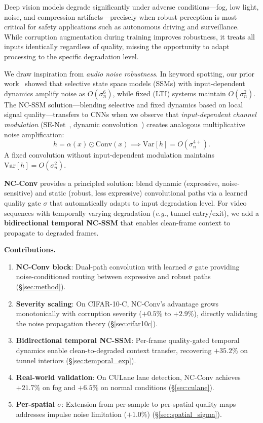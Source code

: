 \documentclass[runningheads]{llncs}
\newcommand{\eg}{\emph{e.g.}}
\begin{document}
Deep vision models degrade significantly under adverse conditions---fog, low light, noise, and compression artifacts---precisely when robust perception is most critical for safety applications such as autonomous driving and surveillance.
While corruption augmentation during training improves robustness, it treats all inputs identically regardless of quality, missing the opportunity to adapt processing to the specific degradation level.

We draw inspiration from \emph{audio noise robustness}.
In keyword spotting, our prior work~\cite{choi2026ncssm} showed that selective state space models (SSMs) with input-dependent dynamics amplify noise as $O(\sigma_n^6)$, while fixed (LTI) systems maintain $O(\sigma_n^2)$.
The NC-SSM solution---blending selective and fixed dynamics based on local signal quality---transfers to CNNs when we observe that \emph{input-dependent channel modulation} (SE-Net~\cite{hu2018squeeze}, dynamic convolution~\cite{chen2020dynamic}) creates analogous multiplicative noise amplification:
\begin{equation}
h = \alpha(x) \odot \text{Conv}(x) \implies \text{Var}[h] = O(\sigma_n^{4+}).
\end{equation}
A fixed convolution without input-dependent modulation maintains $\text{Var}[h] = O(\sigma_n^2)$.

\textbf{NC-Conv} provides a principled solution: blend dynamic (expressive, noise-sensitive) and static (robust, less expressive) convolutional paths via a learned quality gate $\sigma$ that automatically adapts to input degradation level.
For video sequences with temporally varying degradation (\eg, tunnel entry/exit), we add a \textbf{bidirectional temporal NC-SSM} that enables clean-frame context to propagate to degraded frames.

\noindent\textbf{Contributions.}
\begin{enumerate}
\setlength\itemsep{0pt}
\item \textbf{NC-Conv block}: Dual-path convolution with learned $\sigma$ gate providing noise-conditioned routing between expressive and robust paths (\S\ref{sec:method}).
\item \textbf{Severity scaling}: On CIFAR-10-C, NC-Conv's advantage grows monotonically with corruption severity ($+0.5\%$ to $+2.9\%$), directly validating the noise propagation theory (\S\ref{sec:cifar10c}).
\item \textbf{Bidirectional temporal NC-SSM}: Per-frame quality-gated temporal dynamics enable clean-to-degraded context transfer, recovering $+35.2\%$ on tunnel interiors (\S\ref{sec:temporal_exp}).
\item \textbf{Real-world validation}: On CULane lane detection, NC-Conv achieves $+21.7\%$ on fog and $+6.5\%$ on normal conditions (\S\ref{sec:culane}).
\item \textbf{Per-spatial $\sigma$}: Extension from per-sample to per-spatial quality maps addresses impulse noise limitation ($+1.0\%$) (\S\ref{sec:spatial_sigma}).
\end{enumerate}
\end{document}
